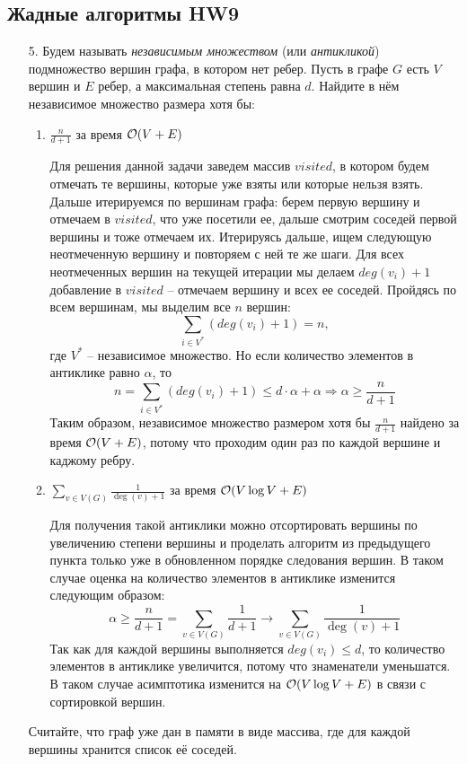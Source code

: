\subsection{Жадные алгоритмы HW9}
\begin{enumerate}
    \item[5.] 
    Будем называть \textit{независимым множеством} (или \textit{антикликой}) подмножество вершин
    графа, в котором нет ребер. Пусть в графе $G$ есть $V$ вершин и $E$ ребер, а максимальная
    степень равна $d$. Найдите в нём независимое множество размера хотя бы:
	\begin{enumerate}
	  \item $\frac{n}{d+1}$ за время $\mathcal{O}(V + E)$
	  \begin{solution}
      Для решения данной задачи заведем массив $visited$, в котором будем отмечать те вершины, которые уже взяты или которые нельзя взять. Дальше итерируемся по вершинам графа: берем первую вершину и отмечаем в $visited$, что уже посетили ее, дальше смотрим соседей первой вершины и тоже отмечаем их. Итерируясь дальше, ищем следующую неотмеченную вершину и повторяем с ней те же шаги. Для всех неотмеченных вершин на текущей итерации мы делаем $deg(v_i)+1$ добавление в $visited$ -- отмечаем вершину и всех ее соседей. Пройдясь по всем вершинам, мы выделим все $n$ вершин:
      \begin{equation}
        \sum_{i \in V^*}(deg(v_i)+1)=n,
      \end{equation}
      где $V^*$ -- независимое множество. Но если количество элементов в антиклике равно $\alpha$, то
      \begin{equation}
        n=\sum_{i \in V^*}(deg(v_i)+1) \le d\cdot\alpha + \alpha \Rightarrow \alpha \ge \frac{n}{d+1}
      \end{equation}
      Таким образом, независимое множество размером хотя бы $\frac{n}{d+1}$ найдено за время $\mathcal{O}(V + E)$, потому что проходим один раз по каждой вершине и каджому ребру.
    \end{solution}
	  \item $\sum\limits_{v\in V(G)} \frac{1}{\deg(v)+1}$ за время $\mathcal{O}(V \log{V} + E)$
	  \begin{solution}
      Для получения такой антиклики можно отсортировать вершины по увеличению  степени вершины и проделать алгоритм из предыдущего пункта только уже в обновленном порядке следования вершин. В таком случае оценка на количество элементов в антиклике изменится следующим образом:
      \begin{equation}
        \alpha\ge\frac{n}{d+1} = \sum\limits_{v\in V(G)} \frac{1}{d+1} \to \sum\limits_{v\in V(G)} \frac{1}{\deg(v)+1}
      \end{equation}
      Так как для каждой вершины выполняется $deg(v_i) \le d$, то количество элементов в антиклике увеличится, потому что знаменатели уменьшатся. В таком случае асимптотика изменится на $\mathcal{O}(V \log{V} + E)$ в связи с сортировкой вершин.
    \end{solution}
	\end{enumerate}
	Считайте, что граф уже дан в памяти в виде массива, где для каждой вершины хранится список её соседей.


\end{enumerate}
